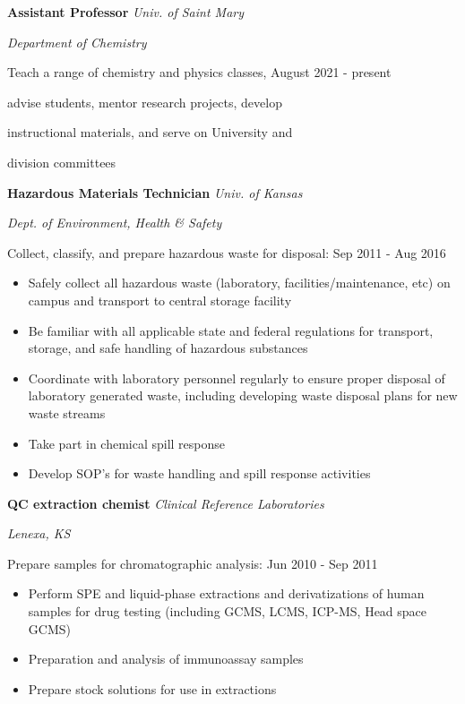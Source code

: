 {\bf Assistant Professor} \hfill \textit{Univ. of Saint Mary}

\hfill \textit{Department of Chemistry}

Teach a range of chemistry and physics classes,  \hfill August 2021 - present

advise students, mentor research projects, develop

instructional materials, and serve on University and 

division committees

\vspace{\y}
{\bf Hazardous Materials Technician} \hfill \textit{Univ. of Kansas}

\hfill \textit{Dept. of Environment, Health \& Safety}

Collect, classify, and prepare hazardous waste for disposal: \hfill Sep 2011 - Aug 2016
\begin{itemize}[rightmargin=\dimexpr\linewidth-8cm-\leftmargin\relax,noitemsep,topsep=0cm]
\raggedright
  \item Safely collect all hazardous waste (laboratory, facilities/maintenance, etc) on campus and transport to central storage facility
  \item Be familiar with all applicable state and federal regulations for transport, storage, and safe handling of hazardous substances
  \item Coordinate with laboratory personnel regularly to ensure proper disposal of laboratory generated waste, including developing waste disposal plans for new waste streams
  \item Take part in chemical spill response
  \item Develop SOP's for waste handling and spill response activities
\end{itemize}

\vspace{\y}
{\bf QC extraction chemist} \hfill \textit{Clinical Reference Laboratories}

\hfill \textit{Lenexa, KS}

Prepare samples for chromatographic analysis: \hfill Jun 2010 - Sep 2011
\begin{itemize}[rightmargin=\dimexpr\linewidth-8cm-\leftmargin\relax,noitemsep,topsep=0cm]
\raggedright
  \item Perform SPE and liquid-phase extractions and derivatizations of human samples for drug testing (including GCMS, LCMS, ICP-MS, Head space GCMS)
  \item Preparation and analysis of immunoassay samples
  \item Prepare stock solutions for use in extractions
\end{itemize}
